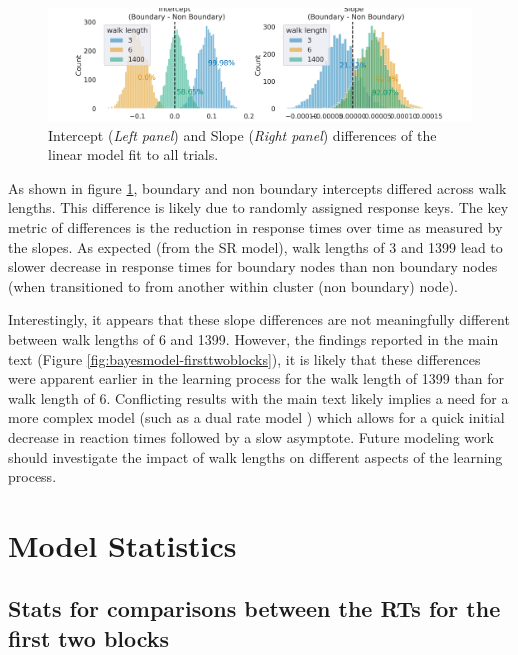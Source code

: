 \begin{figure}[H]
    \centering
    \includegraphics[width = \textwidth]{chapter_notebooks/chapter_2/figures/allblocks_lrmodel_trial_ppt_lag.png}
    \caption{Intercept (\textit{Left panel}) and Slope (\textit{Right panel}) differences of the linear model fit to all trials.}
    \label{fig:alltrial-lrmodel}
\end{figure}

As shown in figure \ref{fig:alltrial-lrmodel}, boundary and non boundary intercepts differed across walk lengths. This difference is likely due to randomly assigned response keys. The key metric of differences is the reduction in response times over time as measured by the slopes. As expected (from the SR model), walk lengths of 3 and 1399 lead to slower decrease in response times for boundary nodes than non boundary nodes (when transitioned to from another within cluster (non boundary) node). 

Interestingly, it appears that these slope differences are not meaningfully different between walk lengths of 6 and 1399. However, the findings reported in the main text (Figure \ref{fig:bayesmodel-firsttwoblocks}), it is likely that these differences were apparent earlier in the learning process for the walk length of 1399 than for walk length of 6. Conflicting results with the main text likely implies a need for a more complex model (such as a dual rate model \cite{mcdougle2015explicit, smith2006interacting, savalia2022leap}) which allows for a quick initial decrease in reaction times followed by a slow asymptote. Future modeling work should investigate the impact of walk lengths on different aspects of the learning process.

\section{Model Statistics}

\subsection*{Stats for comparisons between the RTs for the first two blocks}

